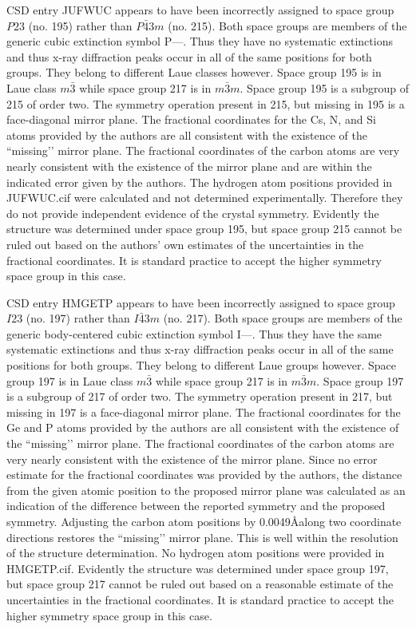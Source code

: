 \documentclass{iucr}              %
\begin{document}
CSD entry JUFWUC \cite{Tesh92} appears to have been incorrectly assigned to space group $P23$ (no. 195) rather than $P\bar{4}3m$ (no. 215).  Both space groups are members of the generic cubic extinction symbol P---.  Thus they have no systematic extinctions and thus x-ray diffraction peaks occur in all of the same positions for both groups.  They belong to different Laue classes however.  Space group 195 is in Laue class $m\bar{3}$ while space group 217 is in $m\bar{3}m$.  Space group 195 is a subgroup of 215 of order two.  The symmetry operation present in 215, but missing in 195 is a face-diagonal mirror plane.  The fractional coordinates for the Cs, N, and Si atoms provided by the authors are all consistent with the existence of the ``missing’’ mirror plane.  The fractional coordinates of the carbon atoms are very nearly consistent with the existence of the mirror plane and are within the indicated error given by the authors.  The hydrogen atom positions provided in JUFWUC.cif were calculated and not determined experimentally.  Therefore they do not provide independent evidence of the crystal symmetry.  Evidently the structure was determined under space group 195, but space group 215 cannot be ruled out based on the authors’ own estimates of the uncertainties in the fractional coordinates.  It is standard practice to accept the higher symmetry space group in this case.

CSD entry HMGETP \cite{Dahl75} appears to have been incorrectly assigned to space group $I23$ (no. 197) rather than $I\bar{4}3m$ (no. 217).  Both space groups are members of the generic body-centered cubic extinction symbol I---.  Thus they have the same systematic extinctions and thus x-ray diffraction peaks occur in all of the same positions for both groups.  They belong to different Laue groups however.  Space group 197 is in Laue class $m\bar{3}$ while space group 217 is in $m\bar{3}m$.    Space group 197 is a subgroup of 217 of order two.  The symmetry operation present in 217, but missing in 197 is a face-diagonal mirror plane.  The fractional coordinates for the Ge and P atoms provided by the authors are all consistent with the existence of the ``missing’’ mirror plane.  The fractional coordinates of the carbon atoms are very nearly consistent with the existence of the mirror plane.  Since no error estimate for the fractional coordinates was provided by the authors, the distance from the given atomic position to the proposed mirror plane was calculated as an indication of the difference between the reported symmetry and the proposed symmetry.  Adjusting the carbon atom positions by 0.0049\AA along two coordinate directions restores the ``missing’’ mirror plane.  This is well within the resolution of the structure determination.  No hydrogen atom positions were provided in HMGETP.cif.  Evidently the structure was determined under space group 197, but space group 217 cannot be ruled out based on a reasonable estimate of the uncertainties in the fractional coordinates.  It is standard practice to accept the higher symmetry space group in this case.
\end{document}
